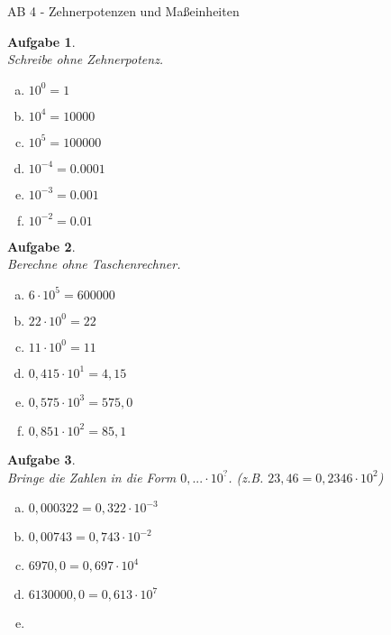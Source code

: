 \documentclass[12pt,fleqn]{article}
\theoremstyle{aufg}
\newtheorem{aufgabe}{Aufgabe}
\theoremstyle{bsp}
\begin{document}
 
    \begin{flushleft}
\begin{center}AB 4 - Zehnerpotenzen und Ma\ss{}einheiten\end{center}\begin{aufgabe} ~ \\ 
Schreibe ohne Zehnerpotenz. \\ 
\begin{multicols}{3} 
\begin{enumerate}[a)] 
\item 
$10^{0}=1$
\item 
$10^{4}=10000$
\item 
$10^{5}=100000$
\item 
$10^{-4}=0.0001$
\item 
$10^{-3}=0.001$
\item 
$10^{-2}=0.01$
\end{enumerate} 
\end{multicols} 
\end{aufgabe} 
\begin{aufgabe} ~ \\ 
Berechne ohne Taschenrechner. \\ 
\begin{multicols}{3} 
\begin{enumerate}[a)] 
\item 
$6\cdot10^{5}=600000$
\item 
$22\cdot10^{0}=22$
\item 
$11\cdot10^{0}=11$
\item 
$0,415\cdot10^{1}=4,15$
\item 
$0,575\cdot10^{3}=575,0$
\item 
$0,851\cdot10^{2}=85,1$
\end{enumerate} 
\end{multicols} 
\end{aufgabe} 
\begin{aufgabe} ~ \\ 
Bringe die Zahlen in die Form $0,... \cdot 10^{?}$. (z.B. $23,46 = 0,2346 \cdot 10^2$) \\ 
\begin{multicols}{3} 
\begin{enumerate}[a)] 
\item 
$0,000322=0,322\cdot10^{-3}$
\item 
$0,00743=0,743\cdot10^{-2}$
\item 
$6970,0=0,697\cdot10^{4}$
\item 
$6130000,0=0,613\cdot10^{7}$
\item 

\end{enumerate}
\end{multicols}
\end{aufgabe}
\end{flushleft}
\end{document}
